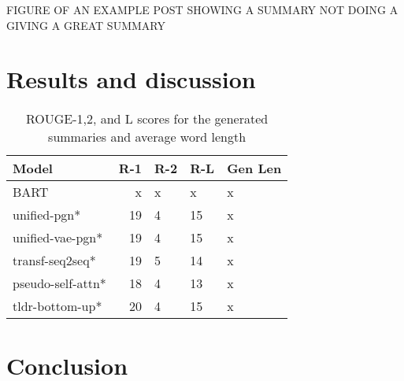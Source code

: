 \documentclass[11pt,a4paper, twocolumn]{article}
\begin{document}
FIGURE OF AN EXAMPLE POST SHOWING A SUMMARY NOT DOING A GIVING A GREAT SUMMARY


\section{Results and discussion}

\begin{table}
\centering
\begin{tabular}{lrlll}
\hline \textbf{Model} & \textbf{R-1} & \textbf{R-2} & \textbf{R-L} & \textbf{Gen Len} \\ \hline
BART & x & x & x & x \\
unified-pgn* & 19 & 4 & 15 & x \\
unified-vae-pgn* & 19 & 4 & 15 & x \\
transf-seq2seq* & 19 & 5 & 14 & x \\
pseudo-self-attn* & 18 & 4 & 13 & x \\
tldr-bottom-up* & 20 & 4  & 15 & x\\
\hline
\end{tabular}
\caption{\label{font-table} ROUGE-1,2, and L scores for the generated summaries and average word length}
\end{table}

\section{Conclusion}
\end{document}
